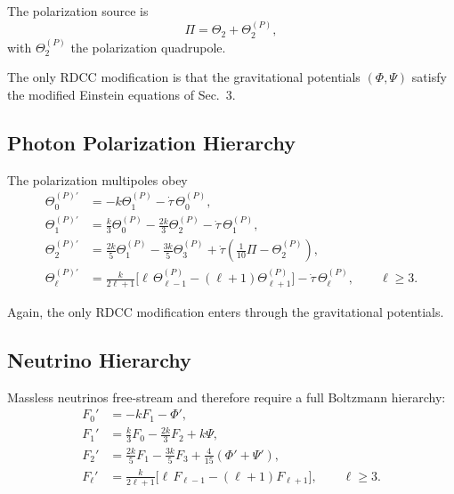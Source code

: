 \documentclass[11pt,a4paper]{article}
\begin{document}
The polarization source is
\begin{equation}
    \Pi = \Theta_{2} + \Theta_{2}^{(P)},
\end{equation}
with $\Theta_{2}^{(P)}$ the polarization quadrupole.

The only RDCC modification is that the gravitational potentials $(\Phi,\Psi)$ satisfy the
modified Einstein equations of Sec.~3.

\subsection{Photon Polarization Hierarchy}

The polarization multipoles obey
\begin{align}
    \Theta_{0}^{(P)\prime} &= -k\Theta_{1}^{(P)} - \dot{\tau}\,\Theta_{0}^{(P)}, \\
    \Theta_{1}^{(P)\prime} &= \frac{k}{3}\Theta_{0}^{(P)} - \frac{2k}{3}\Theta_{2}^{(P)}
                             - \dot{\tau}\,\Theta_{1}^{(P)}, \\
    \Theta_{2}^{(P)\prime} &= \frac{2k}{5}\Theta_{1}^{(P)} - \frac{3k}{5}\Theta_{3}^{(P)}
                             + \dot{\tau}\left(\frac{1}{10}\Pi - \Theta_{2}^{(P)}\right), \\
    \Theta_{\ell}^{(P)\prime} &=
    \frac{k}{2\ell+1}\bigl[\ell\,\Theta_{\ell-1}^{(P)} - (\ell+1)\Theta_{\ell+1}^{(P)}\bigr]
    - \dot{\tau}\,\Theta_{\ell}^{(P)}, \qquad \ell \ge 3.
\end{align}

Again, the only RDCC modification enters through the gravitational potentials.

\subsection{Neutrino Hierarchy}

Massless neutrinos free-stream and therefore require a full Boltzmann hierarchy:
\begin{align}
    F_{0}' &= -kF_{1} - \Phi', \\
    F_{1}' &= \frac{k}{3}F_{0} - \frac{2k}{3}F_{2} + k\Psi, \\
    F_{2}' &= \frac{2k}{5}F_{1} - \frac{3k}{5}F_{3}
             + \frac{4}{15}(\Phi' + \Psi'), \\
    F_{\ell}' &= \frac{k}{2\ell+1}\bigl[\ell\,F_{\ell-1} - (\ell+1)F_{\ell+1}\bigr],
               \qquad \ell \ge 3.
\end{align}
\end{document}
